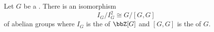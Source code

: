 \begin{lemma} \label{lemma:quotient_of_augmentation_ideal_of_group_by_square_is_isomorphic_to_abelianization_of_group}
    Let $G$ be a . There is an isomorphism
    $$I_G / I_G^2 \cong G/[G,G]$$
    of abelian groups where $I_G$ is the  of $\bbZ[G]$ and $[G,G]$ is the  of $G$. 
\end{lemma}